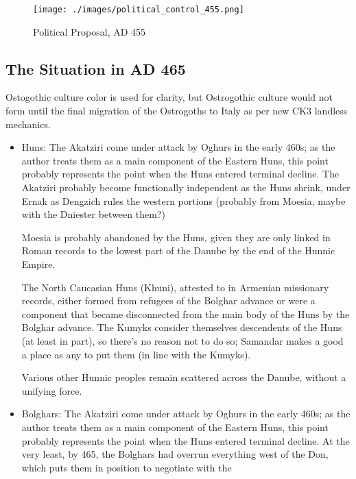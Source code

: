\documentclass{article}
\begin{document}
	\begin{figure}[h!]
		\centering
		\texttt{[image: ./images/political\_control\_455.png]}
		\caption{Political Proposal, AD 455}
	\end{figure}
	
	\newpage
	
	\subsection{The Situation in AD 465}
	\label{sec:timeline:subsec:465}
	Ostogothic culture color is used for clarity, but Ostrogothic culture would not form until the final migration of the Ostrogoths to Italy as per new CK3 landless mechanics.
	
	\begin{itemize}
		\item Huns:\newline
		The Akatziri come under attack by Oghurs in the early 460s; as the author treats them as a main component of the Eastern Huns, this point probably represents the point when the Huns entered terminal decline.
		The Akatziri probably become functionally independent as the Huns shrink, under Ernak as Dengzich rules the western portions (probably from Moesia, maybe with the Dniester between them?)
		
		Moesia is probably abandoned by the Huns, given they are only linked in Roman records to the lowest part of the Danube by the end of the Hunnic Empire.
		
		The North Caucasian Huns (Khuni), attested to in Armenian missionary records, either formed from refugees of the Bolghar advance or were a component that became disconnected from the main body of the Huns by the Bolghar advance.
		The Kumyks consider themselves descendents of the Huns (at least in part), so there's no reason not to do so; Samandar makes a good a place as any to put them (in line with the Kumyks).
		
		Various other Hunnic peoples remain scattered across the Danube, without a unifying force.
		
		\item Bolghars:\newline
		The Akatziri come under attack by Oghurs in the early 460s; as the author treats them as a main component of the Eastern Huns, this point probably represents the point when the Huns entered terminal decline.
		At the very least, by 465, the Bolghars had overrun everything west of the Don, which puts them in position to negotiate with the 
		

\end{itemize}
\end{document}
